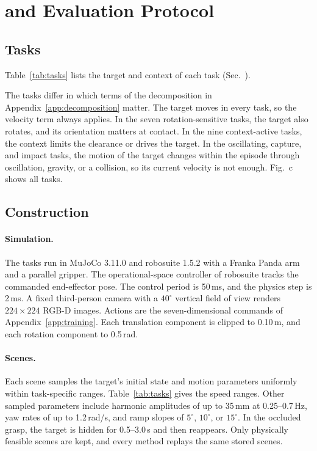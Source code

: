 \section{\bench and Evaluation Protocol}
\label{app:benchmark}

\subsection{Tasks}
\label{app:tasks}
\label{app:roles}
Table~\ref{tab:tasks} lists the target and context of each task (Sec.~).

The tasks differ in which terms of the decomposition in
Appendix~\ref{app:decomposition} matter. The target moves in every task, so the velocity
term always applies. In the seven rotation-sensitive tasks, the target also rotates, and
its orientation matters at contact. In the nine context-active tasks, the context
limits the clearance or drives the target. In the oscillating, capture, and impact tasks, the motion of the target changes within the episode through oscillation, gravity, or a collision, so its current velocity is not enough. Fig.~c shows all tasks.



\subsection{Construction}
\label{app:splits}
\paragraph{Simulation.}
The tasks run in MuJoCo 3.11.0 and robosuite 1.5.2 \cite{mujoco,robosuite} with a
Franka Panda arm and a parallel gripper. The operational-space controller of robosuite
tracks the commanded end-effector pose. The control period is 50\,ms, and the physics
step is 2\,ms. A fixed third-person camera with a $40^\circ$ vertical field of view
renders $224\times224$ RGB-D images. Actions are the seven-dimensional commands of
Appendix~\ref{app:training}. Each translation component is clipped to 0.10\,m, and each
rotation component to 0.5\,rad.

\paragraph{Scenes.}
Each scene samples the target's initial state and motion parameters uniformly
within task-specific ranges. Table~\ref{tab:tasks} gives the speed ranges. Other sampled
parameters include harmonic amplitudes of up to 35\,mm at 0.25--0.7\,Hz, yaw rates of up
to 1.2\,rad/s, and ramp slopes of $5^\circ$, $10^\circ$, or $15^\circ$. In the occluded grasp, the target is
hidden for 0.5--3.0\,s and then reappears. Only physically feasible scenes are kept, and every method replays the same stored scenes.

